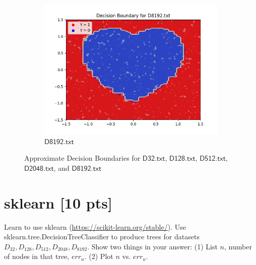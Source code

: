\documentclass[a4paper]{article}
\theoremstyle{definition}
\newenvironment{soln}{
    \leavevmode\color{blue}\ignorespaces
}{}
\begin{document}
\begin{enumerate}
\begin{soln}
\begin{figure}[h]
\begin{subfigure}{0.5\textwidth}
          \includegraphics[width=1.1\linewidth]{Decision_Boundary_D8192.png}
          \caption{$\mathsf{D8192.txt}$}
          \label{fig:7sub5}
          \end{subfigure}%
          \caption{Approximate Decision Boundaries for $\mathsf{D32.txt}$, $\mathsf{D128.txt}$, $\mathsf{D512.txt}$, $\mathsf{D2048.txt}$, and $\mathsf{D8192.txt}$}
          \label{fig:7}
      \end{figure}
  \end{soln}
  
\end{enumerate}

\section{sklearn [10 pts]}
Learn to use sklearn (\url{https://scikit-learn.org/stable/}).
Use sklearn.tree.DecisionTreeClassifier to produce trees for datasets $D_{32}, D_{128}, D_{512}, D_{2048}, D_{8192}$.  Show two things in your answer: (1) List $n$, number of nodes in that tree, $err_n$. (2) Plot $n$ vs. $err_n$.
\end{document}
